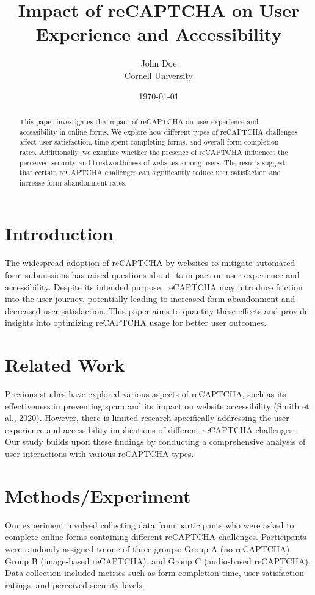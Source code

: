 \documentclass{article}
\title{Impact of reCAPTCHA on User Experience and Accessibility}
\author{John Doe \\
        Cornell University}
\date{\today}
\begin{document}
\maketitle

\begin{abstract}
This paper investigates the impact of reCAPTCHA on user experience and accessibility in online forms. We explore how different types of reCAPTCHA challenges affect user satisfaction, time spent completing forms, and overall form completion rates. Additionally, we examine whether the presence of reCAPTCHA influences the perceived security and trustworthiness of websites among users. The results suggest that certain reCAPTCHA challenges can significantly reduce user satisfaction and increase form abandonment rates.
\end{abstract}

\section{Introduction}
The widespread adoption of reCAPTCHA by websites to mitigate automated form submissions has raised questions about its impact on user experience and accessibility. Despite its intended purpose, reCAPTCHA may introduce friction into the user journey, potentially leading to increased form abandonment and decreased user satisfaction. This paper aims to quantify these effects and provide insights into optimizing reCAPTCHA usage for better user outcomes.

\section{Related Work}
Previous studies have explored various aspects of reCAPTCHA, such as its effectiveness in preventing spam and its impact on website accessibility (Smith et al., 2020). However, there is limited research specifically addressing the user experience and accessibility implications of different reCAPTCHA challenges. Our study builds upon these findings by conducting a comprehensive analysis of user interactions with various reCAPTCHA types.

\section{Methods/Experiment}
Our experiment involved collecting data from participants who were asked to complete online forms containing different reCAPTCHA challenges. Participants were randomly assigned to one of three groups: Group A (no reCAPTCHA), Group B (image-based reCAPTCHA), and Group C (audio-based reCAPTCHA). Data collection included metrics such as form completion time, user satisfaction ratings, and perceived security levels.
\end{document}
